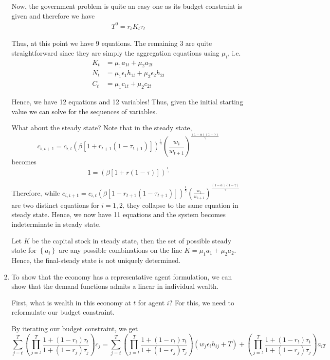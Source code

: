 \documentclass[12pt]{article}
\newcommand{\1}{{\bf 1}} %
\newcommand{\cbra}[1]{\left\{ #1 \right\}}
\begin{document}
\begin{enumerate}[(1)]
 	
 	Now, the government problem is quite an easy one as its budget constraint is given and therefore we have
 	 			\begin{align}	
 T^0 = r_tK_t\tau_t
 	\end{align}
 	
 	Thus, at this point we have 9 equations. The remaining 3 are quite straightforward since they are simply the aggregation equations using $\mu_i$, i.e.
 			\begin{align}	
 	K_t &= \mu_1a_{1t} + \mu_2a_{2t}\\
 	N_t &= \mu_1\epsilon_1h_{1t} + \mu_2\epsilon_2h_{2t}\\
 	C_t &= \mu_1c_{1t} + \mu_2c_{2t}
 	\end{align}
 	
 	Hence, we have 12 equations and 12 variables! Thus, given the initial starting value we can solve for the sequences of variables. 
 	
 	What about the steady state? Note that in the steady state, \[c_{i,t+1} = c_{i,t} \left( \beta [1+r_{t+1}(1-\tau_{t+1})]\right)^{\frac{1}{\gamma}}  \left( \frac{w_t}{w_{t+1}}\right) ^{\frac{(1-\alpha)(1-\gamma)}{\gamma}}\] becomes
 	\[
 	1 =  \left( \beta [1+r(1-\tau)]\right)^{\frac{1}{\gamma}}
 	\]
 	
 	Therefore, while $c_{i,t+1} = c_{i,t} \left( \beta [1+r_{t+1}(1-\tau_{t+1})]\right)^{\frac{1}{\gamma}}  \left( \frac{w_t}{w_{t+1}}\right) ^{\frac{(1-\alpha)(1-\gamma)}{\gamma}}$ are two distinct equations for $i=1,2$, they collapse to the same equation in steady state. Hence, we now have 11 equations and the system becomes indeterminate in steady state.
 	
 		 Let $K$ be the capital stock in steady state, then the set of possible steady state for $\cbra{a_i}$ are any possible combinations on the line $K = \mu_1a_{1} + \mu_2a_{2}$. Hence, the final-steady state is not uniquely determined.
 	
 	
	\item
	
	To show that the economy has a representative agent formulation, we can show that the demand functions admits a linear in individual wealth.
	
	First, what is wealth in this economy at $t$ for agent $i$? For this, we need to reformulate our budget constraint. 
	
	By iterating our budget constraint, we get
	\[
	\sum_{j=t}^T\left(  \prod_{j=t}^{T}\frac{1+(1-r_t)\tau_t}{1+(1-r_j)\tau_j}\right) c_{j} = \sum_{j=t}^T\left(  \prod_{j=t}^{T}\frac{1+(1-r_t)\tau_t}{1+(1-r_j)\tau_j}\right) (w_j\epsilon_ih_{ij}+T) + \left(  \prod_{j=t}^{T}\frac{1+(1-r_t)\tau_t}{1+(1-r_j)\tau_j}\right) a_{iT}
	\]
	

\end{enumerate}
\end{document}
